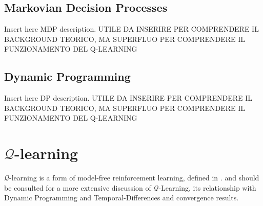 \subsection{Markovian Decision Processes}
\label{Reinforcement-learning-markovian-decision-processes}
Insert here MDP description. 
UTILE DA INSERIRE PER COMPRENDERE IL BACKGROUND TEORICO, MA SUPERFLUO PER COMPRENDERE IL FUNZIONAMENTO DEL Q-LEARNING


\subsection{Dynamic Programming}
\label{Reinforcement-learning-dynamic-programming}
Insert here DP description.
UTILE DA INSERIRE PER COMPRENDERE IL BACKGROUND TEORICO, MA SUPERFLUO PER COMPRENDERE IL FUNZIONAMENTO DEL Q-LEARNING









\section{$\mathcal{Q}$-learning}
\label{sec:reinforcement-learning-q-learning}

$\mathcal{Q}$-learning is a form of model-free reinforcement learning, defined in \cite{watkins1989learning}.
%
%
\cite{watkins1989learning} and \cite{watkins1992q} should be consulted for a more extensive discussion of $\mathcal{Q}$-Learning, its relationship with Dynamic Programming and Temporal-Differences and convergence results.


